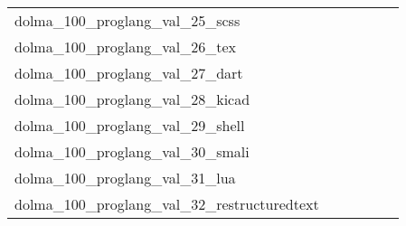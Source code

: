 {\begin{longtable}{m{6cm}m{1.7cm}m{1.7cm}m{1.7cm}m{1.7cm}m{1.7cm}}
	dolma\_100\_proglang\_val\_25\_scss  & \colorbox[HTML]{e0f2a8}{\makebox[\mywidth][c]{2.26}} & \colorbox[HTML]{f0f9b4}{\makebox[\mywidth][c]{2.27}} & \colorbox[HTML]{ffffe5}{\makebox[\mywidth][c]{2.38}} & \colorbox[HTML]{77c578}{\makebox[\mywidth][c]{2.24}} & \colorbox[HTML]{78c679}{\makebox[\mywidth][c]{2.24}}\\
	dolma\_100\_proglang\_val\_26\_tex  & \colorbox[HTML]{77c578}{\makebox[\mywidth][c]{4.04}} & \colorbox[HTML]{eaf7af}{\makebox[\mywidth][c]{4.21}} & \colorbox[HTML]{ffffe5}{\makebox[\mywidth][c]{4.97}} & \colorbox[HTML]{b3df91}{\makebox[\mywidth][c]{4.10}} & \colorbox[HTML]{7ac779}{\makebox[\mywidth][c]{4.04}}\\
	dolma\_100\_proglang\_val\_27\_dart  & \colorbox[HTML]{b3df91}{\makebox[\mywidth][c]{1.79}} & \colorbox[HTML]{e3f4aa}{\makebox[\mywidth][c]{1.82}} & \colorbox[HTML]{ffffe5}{\makebox[\mywidth][c]{2.01}} & \colorbox[HTML]{bee496}{\makebox[\mywidth][c]{1.80}} & \colorbox[HTML]{77c578}{\makebox[\mywidth][c]{1.78}}\\
	dolma\_100\_proglang\_val\_28\_kicad  & \colorbox[HTML]{77c578}{\makebox[\mywidth][c]{2.57}} & \colorbox[HTML]{e5f4ab}{\makebox[\mywidth][c]{2.79}} & \colorbox[HTML]{ffffe5}{\makebox[\mywidth][c]{3.86}} & \colorbox[HTML]{bee496}{\makebox[\mywidth][c]{2.68}} & \colorbox[HTML]{b8e293}{\makebox[\mywidth][c]{2.67}}\\
	dolma\_100\_proglang\_val\_29\_shell  & \colorbox[HTML]{d0ec9e}{\makebox[\mywidth][c]{3.71}} & \colorbox[HTML]{e2f3a9}{\makebox[\mywidth][c]{3.74}} & \colorbox[HTML]{ffffe5}{\makebox[\mywidth][c]{4.31}} & \colorbox[HTML]{c3e698}{\makebox[\mywidth][c]{3.69}} & \colorbox[HTML]{77c578}{\makebox[\mywidth][c]{3.63}}\\
	dolma\_100\_proglang\_val\_30\_smali  & \colorbox[HTML]{c3e698}{\makebox[\mywidth][c]{1.38}} & \colorbox[HTML]{f8fcbf}{\makebox[\mywidth][c]{1.39}} & \colorbox[HTML]{ffffe5}{\makebox[\mywidth][c]{1.45}} & \colorbox[HTML]{ccea9c}{\makebox[\mywidth][c]{1.38}} & \colorbox[HTML]{77c578}{\makebox[\mywidth][c]{1.37}}\\
	dolma\_100\_proglang\_val\_31\_lua  & \colorbox[HTML]{e6f5ad}{\makebox[\mywidth][c]{5.65}} & \colorbox[HTML]{fbfdd4}{\makebox[\mywidth][c]{6.01}} & \colorbox[HTML]{ffffe5}{\makebox[\mywidth][c]{7.18}} & \colorbox[HTML]{77c578}{\makebox[\mywidth][c]{5.33}} & \colorbox[HTML]{b3df91}{\makebox[\mywidth][c]{5.45}}\\
	dolma\_100\_proglang\_val\_32\_restructuredtext  & \colorbox[HTML]{d3eda0}{\makebox[\mywidth][c]{4.01}} & \colorbox[HTML]{e7f5ad}{\makebox[\mywidth][c]{4.05}} & \colorbox[HTML]{ffffe5}{\makebox[\mywidth][c]{4.66}} & \colorbox[HTML]{b6e092}{\makebox[\mywidth][c]{3.97}} & \colorbox[HTML]{77c578}{\makebox[\mywidth][c]{3.92}}\\

\end{longtable}}
